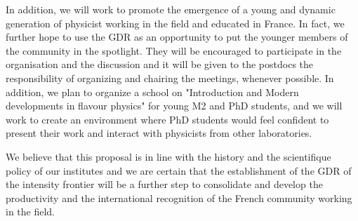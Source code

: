 In addition, we will work to promote the emergence of a young and dynamic generation of physicist working in the field and educated in France.  In fact, we further hope to use the GDR as an opportunity to put the younger members of the community in the spotlight.  They will be encouraged to participate in the organisation and the discussion and it will be given to the postdocs the responsibility of organizing and chairing the meetings, whenever possible. In addition, we plan to  organize  a school on "Introduction and Modern developments in flavour physics" for young M2 and PhD students, and we will work to create an environment where PhD students would feel confident to present their work and interact with physicists from other laboratories. 

We believe that this proposal is in line with the history and the scientifique policy of our institutes and we are certain that  the establishment of the GDR of the intensity frontier will be a further step  to  consolidate and develop  the  productivity and the international recognition of the French community working in the field.  
